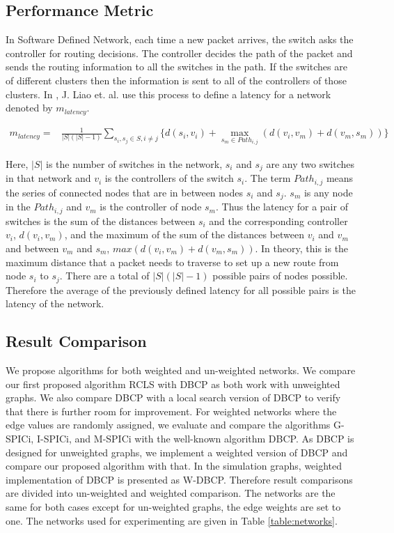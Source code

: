 \documentclass[times]{dacauth}
\begin{document}
\subsection{Performance Metric}
In Software Defined Network, each time a new packet arrives, the switch asks the controller for routing decisions. The controller decides the path of the packet and sends the routing information to all the switches in the path. If the switches are of different clusters then the information is sent to all of the controllers of those clusters. In \cite{dbcp2017}, J. Liao et. al. use this process to define a latency for a network denoted by $m_{latency}$.

\begin{equation} \label{eqn:metric}
\begin{split}
m_{latency} =& \frac{1}{|S|(|S|-1)}\sum_{s_i,s_j\in S, i\neq j}\{d(s_i,v_i)+\max_{s_m \in Path_{i,j}}(d(v_i,v_m)+d(v_m,s_m))\}
\end{split}
\end{equation}

Here, $|S|$ is the number of switches in the network, $s_i$ and $s_j$ are any two switches in that network and $v_i$ is the controllers of the switch $s_i$. The term $Path_{i,j}$ means the series of connected nodes that are in between nodes $s_i$ and $s_j$. $s_m$ is any node in the $Path_{i,j}$ and $v_m$ is the controller of node $s_m$.
Thus the latency for a pair of switches is the sum of the distances between $s_i$ and the corresponding controller $v_i$, $d(v_i,v_m)$, and the maximum of the sum of the distances between $v_i$ and $v_m$ and between $v_m$ and $s_m$, $max(d(v_i,v_m)+d(v_m,s_m))$. In theory, this is the maximum distance that a packet needs to traverse to set up a new route from node $s_i$ to $s_j$. There are a total of $|S|(|S|-1)$ possible pairs of nodes possible. Therefore the average of the previously defined latency for all possible pairs is the latency of the network.
\subsection{Result Comparison}

We propose algorithms for both weighted and un-weighted networks. We compare our first proposed algorithm RCLS with DBCP as both work with unweighted graphs. We also compare DBCP with a local search version of DBCP to verify that there is further room for improvement. For weighted networks where the edge values are randomly assigned, we evaluate and compare the algorithms G-SPICi, I-SPICi, and M-SPICi with the well-known algorithm DBCP. As DBCP is designed for unweighted graphs, we implement a weighted version of DBCP and compare our proposed algorithm with that. In the simulation graphs, weighted implementation of DBCP is presented as W-DBCP. Therefore result comparisons are divided into un-weighted and weighted comparison. The networks are the same for both cases except for un-weighted graphs, the edge weights are set to one. The networks used for experimenting are given in Table \ref{table:networks}.
\end{document}
